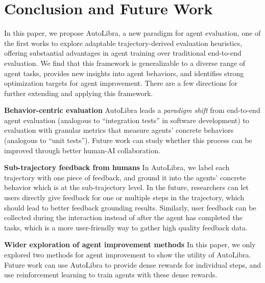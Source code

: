\section{Conclusion and Future Work}
In this paper, we propose AutoLibra, a new paradigm for agent evaluation, one of
the first works to explore adaptable trajectory-derived evaluation heuristics,
offering substantial advantages in agent training over traditional end-to-end
evaluation. We find that this framework is generalizable to a diverse range of agent
tasks, provides new insights into agent behaviors, and identifies strong optimization
targets for agent improvement. There are a few directions for further extending
and applying this framework.

\textbf{Behavior-centric evaluation} AutoLibra leads a \emph{paradigm shift}
from end-to-end agent evaluation (analogous to ``integration tests'' in software
development) to evaluation with granular metrics that measure agents' concrete behaviors
(analogous to ``unit tests''). Future work can study whether this process can be
improved through better human-AI collaboration.

\textbf{Sub-trajectory feedback from humans} In AutoLibra, we label each
trajectory with one piece of feedback, and ground it into the agents' concrete
behavior which is at the sub-trajectory level. In the future, researchers can
let users directly give feedback for one or multiple steps in the trajectory, which
should lead to better feedback grounding results. Similarly, user feedback can be
collected during the interaction instead of after the agent has completed the tasks,
which is a more user-friendly way to gather high quality feedback data.

\textbf{Wider exploration of agent improvement methods} In this paper, we only
explored two methods for agent improvement to show the utility of AutoLibra. Future work can use AutoLibra to provide dense rewards for individual
steps, and use reinforcement learning to train agents with these dense rewards.
